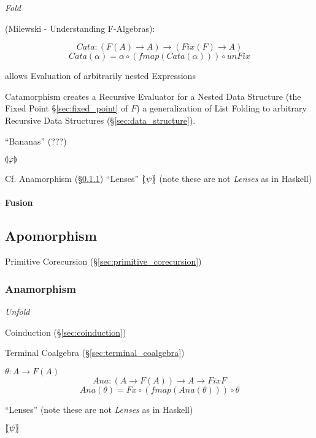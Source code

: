\emph{Fold}

(Milewski - Understanding F-Algebras):

\[
  Cata : (F (A) \rightarrow A) \rightarrow (Fix (F) \rightarrow A)
\]\[
  Cata (\alpha) = \alpha \circ (fmap (Cata (\alpha))) \circ unFix
\]

allows Evaluation of arbitrarily nested Expressions

Catamorphism creates a Recursive Evaluator for a Nested Data Structure
(the Fixed Point \S\ref{sec:fixed_point} of $F$) a generalization of
List Folding to arbitrary Recursive Data Structures
(\S\ref{sec:data_structure}).

``Bananas'' (???) %

$\llparenthesis \varphi \rrparenthesis$

\fist Cf. Anamorphism (\S\ref{sec:anamorphism}) ``Lenses'' $[\kern-1.95pt(
\psi )\kern-2.0pt]$ (note these are not \emph{Lenses} as in Haskell)


\paragraph{Fusion}\label{sec:fusion}\hfill



\subsection{Apomorphism}\label{sec:apomorphism}

Primitive Corecursion (\S\ref{sec:primitive_corecursion})



\subsubsection{Anamorphism}\label{sec:anamorphism}

\emph{Unfold}

Coinduction (\S\ref{sec:coinduction})

Terminal Coalgebra (\S\ref{sec:terminal_coalgebra})

$\theta : A \rightarrow F(A)$
\[
  Ana : (A \rightarrow F (A)) \rightarrow A \rightarrow Fix F
\]\[
  Ana (\theta) = Fx \circ (fmap (Ana (\theta))) \circ \theta
\]

``Lenses'' (note these are not \emph{Lenses} as in Haskell)

$[\kern-1.95pt( \psi )\kern-2.0pt]$

